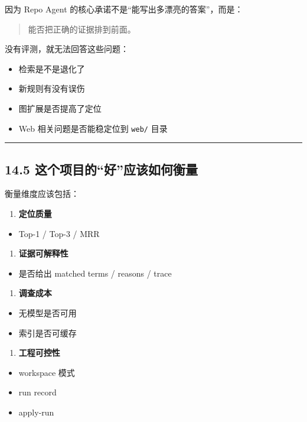 \documentclass[UTF8,12pt,openany]{ctexbook}
\begin{document}
因为 Repo Agent 的核心承诺不是“能写出多漂亮的答案”，而是：\par

\begin{quote}
能否把正确的证据排到前面。
\end{quote}

没有评测，就无法回答这些问题：\par

\begin{itemize}
\item 检索是不是退化了
\item 新规则有没有误伤
\item 图扩展是否提高了定位
\item Web 相关问题是否能稳定位到 \texttt{web/} 目录
\end{itemize}

\hrule

\subsection{14.5 这个项目的“好”应该如何衡量}

衡量维度应该包括：\par

\begin{enumerate}
\item \textbf{定位质量}
\end{enumerate}
\begin{itemize}
\item Top-1 / Top-3 / MRR
\end{itemize}

\begin{enumerate}
\item \textbf{证据可解释性}
\end{enumerate}
\begin{itemize}
\item 是否给出 matched terms / reasons / trace
\end{itemize}

\begin{enumerate}
\item \textbf{调查成本}
\end{enumerate}
\begin{itemize}
\item 无模型是否可用
\item 索引是否可缓存
\end{itemize}

\begin{enumerate}
\item \textbf{工程可控性}
\end{enumerate}
\begin{itemize}
\item workspace 模式
\item run record
\item apply-run
\end{itemize}
\end{document}
